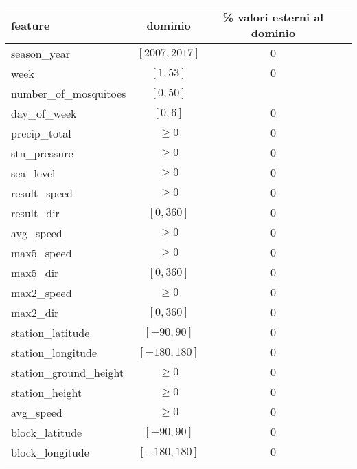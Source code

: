 \vspace{.5em}
\begin{centering}
	\begin{tabular}{lccc}
		\toprule
		feature & dominio & \% valori esterni al dominio \\
		\midrule
		season\_year & $[2007, 2017]$ & $0$ \\
		week &	$[1, 53]$ & $0$ \\
		number\_of\_mosquitoes &	$[0, 50]$ \\
		day\_of\_week &	$[0, 6]$ & $0$ \\
		precip\_total &	$\geq 0$ & $0$ \\
		stn\_pressure &	$\geq 0$ & $0$ \\
		sea\_level &	$\geq 0$ & $0$ \\
		result\_speed &	$\geq 0$ & $0$ \\
		result\_dir &	$[0, 360]$ & $0$ \\
		avg\_speed &	$\geq 0$ & $0$ \\
		max5\_speed &	$\geq 0$ & $0$ \\
		max5\_dir &	$[0, 360]$ & $0$ \\
		max2\_speed &	$\geq 0$ & $0$ \\
		max2\_dir &	$[0, 360]$ & $0$ \\
		station\_latitude & $[-90, 90]$ & $0$ \\
		station\_longitude & $[-180, 180]$ & $0$ \\
		station\_ground\_height &	$\geq 0$ & $0$ \\
		station\_height & $\geq 0$ & $0$ \\
		avg\_speed & $\geq 0$ & $0$ \\
		block\_latitude & $[-90, 90]$ & $0$ \\
		block\_longitude & $[-180, 180]$ & $0$ \\
		\bottomrule
	\end{tabular}
	\label{tab:features-accuracy}
\end{centering}
